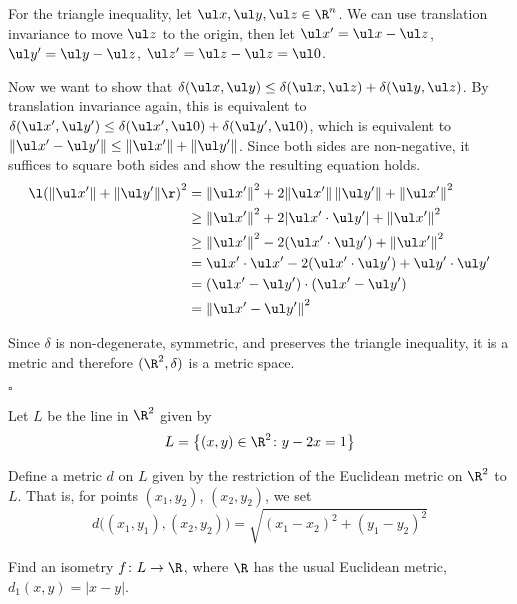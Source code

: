 \documentclass[a4paper]{article}
\begin{document}
For the triangle inequality, let $\ul x, \ul y, \ul z \in \R^n$. We can use translation invariance to move $\ul z$ to the origin, then let $\ul x' = \ul x - \ul z$, $\ul y' = \ul y - \ul z$, $\ul z' = \ul z - \ul z = \ul 0$.

Now we want to show that $\delta(\ul x, \ul y) \le \delta(\ul x, \ul z) + \delta(\ul y, \ul z)$. By translation invariance again, this is equivalent to $\delta(\ul x', \ul y') \le \delta(\ul x', \ul 0) + \delta(\ul y', \ul 0)$, which is equivalent to $\| \ul x' - \ul y' \| \le \| \ul x' \| + \| \ul y' \|$. Since both sides are non-negative, it suffices to square both sides and show the resulting equation holds.
\begin{align*}
{\l( \| \ul x' \| + \| \ul y' \| \r)}^2 &=
  {\| \ul x' \|}^2 + 2 {\| \ul x' \|} \, {\| \ul y' \|} + {\| \ul x' \|}^2 \\
&\ge {\| \ul x' \|}^2 + 2 {| \ul x' \cdot \ul y' |} + {\| \ul x' \|}^2 \\
&\ge {\| \ul x' \|}^2 - 2 (\ul x' \cdot \ul y') + {\| \ul x' \|}^2 \\
&= \ul x' \cdot \ul x' - 2 (\ul x' \cdot \ul y') + \ul y' \cdot \ul y' \\
&= (\ul x' - \ul y') \cdot (\ul x' - \ul y') \\
&= {\| \ul x' - \ul y' \|}^2
\end{align*}

Since $\delta$ is non-degenerate, symmetric, and preserves the triangle inequality, it is a metric and therefore $(\R^2, \delta)$ is a metric space.

\hfill $\square$



\begin{questionbody}
Let $L$ be the line in $\R^2$ given by \[
L = \big\{ (x, y) \in \R^2 \colon y - 2x = 1 \big\}
\]

Define a metric $d$ on $L$ given by the restriction of the Euclidean metric on $\R^2$ to $L$. That is, for points $(x_1, y_2)$, $(x_2, y_2)$, we set \[
d\big( (x_1, y_1), (x_2, y_2) \big) = \sqrt{{(x_1 - x_2)}^2 + {(y_1 - y_2)}^2}
\]

Find an isometry $f \colon L \to \R$, where $\R$ has the usual Euclidean metric, $d_1(x, y) = |x - y|$.
\end{questionbody}

\begin{center}
\end{center}
\end{document}

